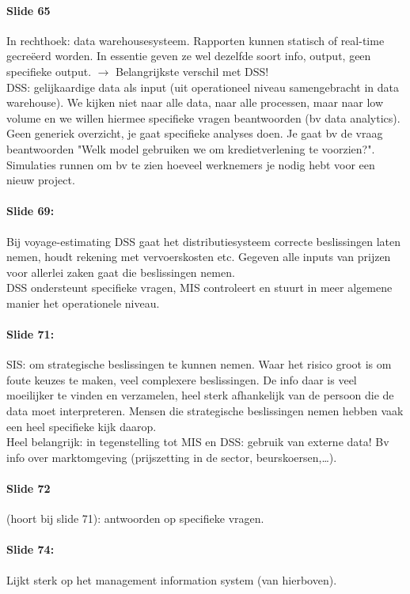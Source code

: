 \documentclass[10pt,a4paper]{report}
\begin{document}
\paragraph{Slide 65}In rechthoek: data warehousesysteem. Rapporten kunnen statisch of real-time gecre\"eerd worden. In essentie geven ze wel dezelfde soort info, output, geen specifieke output. $\rightarrow$ Belangrijkste verschil met DSS!\\
DSS: gelijkaardige data als input (uit operationeel niveau samengebracht in data warehouse). We kijken niet naar alle data, naar alle processen, maar naar low volume en we willen hiermee specifieke vragen beantwoorden (bv data analytics). Geen generiek overzicht, je gaat specifieke analyses doen. Je gaat bv de vraag beantwoorden "Welk model gebruiken we om kredietverlening te voorzien?". Simulaties runnen om bv te zien hoeveel werknemers je nodig hebt voor een nieuw project.

\paragraph{Slide 69:}Bij voyage-estimating DSS gaat het distributiesysteem correcte beslissingen laten nemen, houdt rekening met vervoerskosten etc. Gegeven alle inputs van prijzen voor allerlei zaken gaat die beslissingen nemen.\\
DSS ondersteunt specifieke vragen, MIS controleert en stuurt in meer algemene manier het operationele niveau.

\paragraph{Slide 71:}SIS: om strategische beslissingen te kunnen nemen. Waar het risico groot is om foute keuzes te maken, veel complexere beslissingen. De info daar is veel moeilijker te vinden en verzamelen, heel sterk afhankelijk van de persoon die de data moet interpreteren. Mensen die strategische beslissingen nemen hebben vaak een heel specifieke kijk daarop. \\
Heel belangrijk: in tegenstelling tot MIS en DSS: gebruik van externe data! Bv info over marktomgeving (prijszetting in de sector, beurskoersen,…). 

\paragraph{Slide 72}(hoort bij slide 71): antwoorden op specifieke vragen.

\paragraph{Slide 74:}Lijkt sterk op het management information system (van hierboven).
\end{document}
